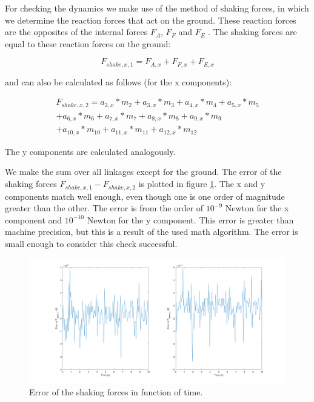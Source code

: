 \documentclass[a4paper]{article}
\begin{document}
For checking the dynamics we make use of the method of shaking forces, in which we determine the reaction forces that act on the ground. These reaction forces are the opposites of the internal forces \(F_A\), \(F_F\) and \(F_E\) . The shaking forces are equal to these reaction forces on the ground: 

\begin{equation}
	F_{shake,x,1} = F_{A,x} + F_{F,x} + F_{E,x}
\end{equation}

and can also be calculated as follows (for the x components):

\begin{equation}
\begin{split}
	F_{shake,x,2} =  a_{2,x}*m_2 + a_{3,x}*m_3 + a_{4,x}*m_4 + a_{5,x}*m_5 \\ 
	 +a_{6,x}*m_6	+ a_{7,x}*m_7 + a_{8,x}*m_8 + a_{9,x}*m_9 \\
	 + a_{10,x}*m_{10} + a_{11,x}*m_{11} + a_{12,x}*m_{12}
\end{split}
\end{equation}

The y components are calculated analogously.

We make the sum over all linkages except for the ground. The error of the shaking forces \(F_{shake,x,1}-F_{shake,x,2}\) is plotted in  figure \ref{fig:contrdyn}. The x and y components match well enough, even though one is one order of magnitude greater than the other. The error is from the order of \(10^{-9}\) Newton for the x component and \(10^{-10}\) Newton for the y component. This error is greater than machine precision, but this is a result of the used math algorithm. The error is small enough to consider this check successful.

\clearpage

\begin{figure}
	\centering
	
	\includegraphics[width = \textwidth]{contrdyn.png}
	
	\caption{Error of the shaking forces in function of time.}
	\label{fig:contrdyn}
	
\end{figure}



\end{document}
